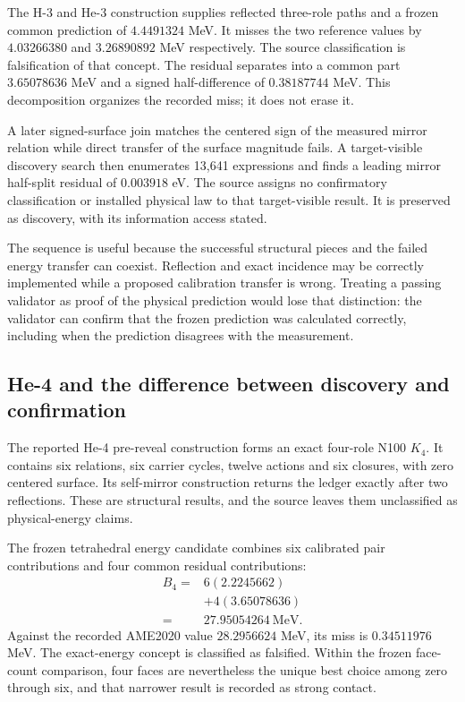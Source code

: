 The H-3 and He-3 construction supplies reflected three-role paths and a frozen common prediction of $4.4491324$ MeV. It misses the two reference values by $4.03266380$ and $3.26890892$ MeV respectively. The source classification is falsification of that concept. The residual separates into a common part $3.65078636$ MeV and a signed half-difference of $0.38187744$ MeV. This decomposition organizes the recorded miss; it does not erase it.

A later signed-surface join matches the centered sign of the measured mirror relation while direct transfer of the surface magnitude fails. A target-visible discovery search then enumerates 13,641 expressions and finds a leading mirror half-split residual of $0.003918$ eV. The source assigns no confirmatory classification or installed physical law to that target-visible result. It is preserved as discovery, with its information access stated.

The sequence is useful because the successful structural pieces and the failed energy transfer can coexist. Reflection and exact incidence may be correctly implemented while a proposed calibration transfer is wrong. Treating a passing validator as proof of the physical prediction would lose that distinction: the validator can confirm that the frozen prediction was calculated correctly, including when the prediction disagrees with the measurement.

\subsection{He-4 and the difference between discovery and confirmation}

The reported He-4 pre-reveal construction forms an exact four-role N100 $K_4$. It contains six relations, six carrier cycles, twelve actions and six closures, with zero centered surface. Its self-mirror construction returns the ledger exactly after two reflections. These are structural results, and the source leaves them unclassified as physical-energy claims.

The frozen tetrahedral energy candidate combines six calibrated pair contributions and four common residual contributions:
\begin{align}
B_4={}&6(2.2245662)\\
&+4(3.65078636)\\
={}&27.95054264\ \mathrm{MeV}.
\end{align}
Against the recorded AME2020 value $28.2956624$ MeV, its miss is $0.34511976$ MeV. The exact-energy concept is classified as falsified. Within the frozen face-count comparison, four faces are nevertheless the unique best choice among zero through six, and that narrower result is recorded as strong contact.\cite{viiatom}


